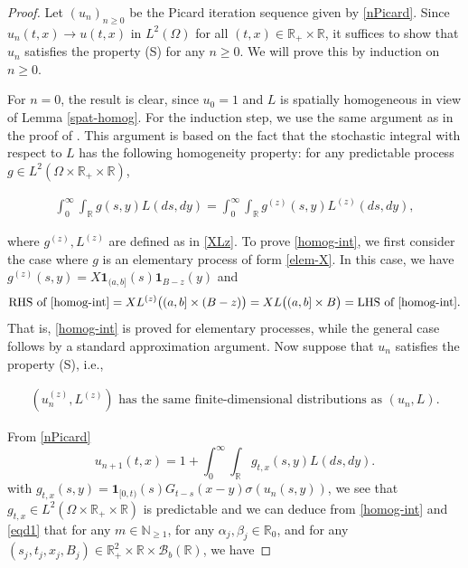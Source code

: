 \documentclass[letterpaper, 11pt,  reqno]{amsart}
\newcommand{\noi}{\noindent}
\newcommand{\R}{\mathbb{R}}
\newcommand{\bR}{\mathbb{R}}
\newcommand{\cB}{\mathcal{B}}
\newcommand{\al}{\alpha}
\newcommand{\be}{\beta}
\newcommand{\s}{\sigma}
\renewcommand{\O}{\Omega}
\newcommand{\ind}{\mathbf 1}
\newcommand{\N}{\mathbb{N}}
\numberwithin{equation}{section}
\numberwithin{theorem}{section}
\begin{document}
\begin{proof}
Let $(u_n)_{n\geq 0}$ be the Picard iteration sequence given by \eqref{nPicard}.
Since $u_n(t,x) \to u(t,x)$ in $L^2(\O)$ for all $(t,x)\in \R_{+}\times \R$, 
it suffices to show that $u_n$ satisfies  the property (S) 
 for any $n \geq 0$.
We will prove this by induction on $n\geq 0$.


For $n=0$, the result is clear, since $u_0=1$ and     $L$ is spatially homogeneous
in view of  Lemma \ref{spat-homog}.
For the induction step, we use the same argument as in the proof of 
\cite[Lemma 18]{dalang99}. 
This argument is based on the fact that the stochastic integral with respect to $L$ 
has the following homogeneity property: 
for any predictable process  $g \in L^2(\Omega \times \bR_{+}\times \bR)$,

\noi
\begin{align}
\label{homog-int}
\int_0^{\infty}\int_{\bR}g(s, y)L(ds, dy)=\int_0^{\infty}\int_{\bR}g^{(z)}(s, y) L^{(z)}(ds, dy),
\end{align}



\noi
where $g^{(z)}, L^{(z)}$ are defined as in \eqref{XLz}.
To prove \eqref{homog-int}, we first consider the case where 
$g$ is an elementary process of form \eqref{elem-X}.  
In this case, we have  $g^{(z)}(s,y)=X \ind_{(a,b]}(s) \ind_{B-z}(y)$
and
\[
\mbox{RHS of \eqref{homog-int}}
= X L^{(z)}\big((a,b] \times (B-z)\big)
=X L\big((a,b] \times B\big)
=\mbox{LHS of \eqref{homog-int}}.
\]
That is,  \eqref{homog-int} is proved for elementary processes, while
the general case follows by a standard approximation argument. 
Now suppose that $u_n$ satisfies the property (S), i.e.,

\noi
\begin{align}\label{eqd1}
\text{$(u_n^{(z)}, L^{(z)})$ has the same finite-dimensional distributions
as $(u_n, L)$}.
\end{align}

\noi
From
\eqref{nPicard}
\[
u_{n+1}(t,x) = 1 + \int_0^\infty \int_\R g_{t,x}(s, y) L(ds, dy).
\]
with $g_{t,x}(s,y) = \ind_{[0,t)}(s) G_{t-s}(x-y) \s( u_n(s,y)  )$,
we see that $g_{t,x}\in L^2(\O\times\R_+\times\R)$ is predictable 
and     we can deduce from  \eqref{homog-int} and \eqref{eqd1}
 that 
for any $m\in\N_{\geq 1}$, for any $\al_j, \be_j\in\R_0$,
and for any $(s_j, t_j, x_j, B_j)\in\R_+^2\times\R\times\cB_b(\R)$,
we have 


\end{proof}
\end{document}
